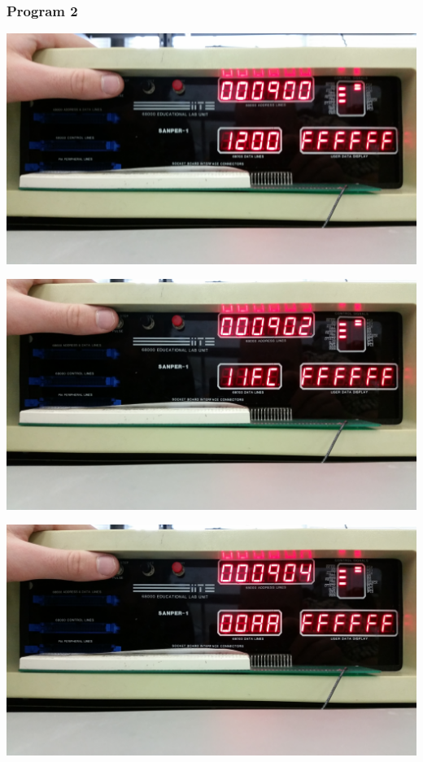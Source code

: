 \documentclass[12pt, twocolumn]{article}
\begin{document}
\subsubsection{Program 2}
\begin{center}
\includegraphics[width=1\linewidth]{Lab1/20150120_094136}
\end{center}
\begin{center}
\includegraphics[width=1\linewidth]{Lab1/20150120_094138}
\end{center}
\begin{center}
\includegraphics[width=1\linewidth]{Lab1/20150120_094140}
\end{center}
\end{document}
